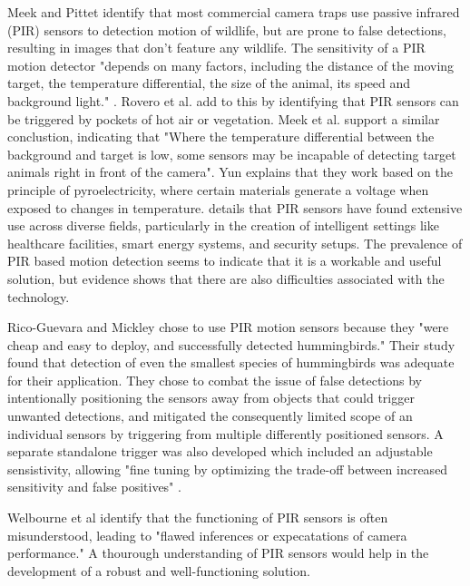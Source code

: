 \documentclass[class=report,11pt,crop=false]{standalone}
\begin{document}
Meek and Pittet \cite{meek2012user} identify that most commercial camera traps use passive infrared (PIR) sensors to detection motion of wildlife, but are prone to false detections, resulting in images that don't feature any wildlife. The sensitivity of a PIR motion detector "depends on many factors, including the distance of the moving target, the temperature differential, the size of the animal, its speed and background light." \cite{meek2012user}. Rovero et al. \cite{rovero2013which} add to this by identifying that PIR sensors can be triggered by pockets of hot air or vegetation. Meek et al. \cite{meek2012introduction} support a similar conclustion, indicating that "Where the temperature differential between the background and target is low, some sensors may be incapable of detecting target animals right in front of the camera". Yun \cite{yun2014detecting} explains that they work based on the principle of pyroelectricity, where certain materials generate a voltage when exposed to changes in temperature. \cite{amusa2015pyro} details that PIR sensors have found extensive use across diverse fields, particularly in the creation of intelligent settings like healthcare facilities, smart energy systems, and security setups.
The prevalence of PIR based motion detection seems to indicate that it is a workable and useful solution, but evidence shows that there are also difficulties associated with the technology.

Rico-Guevara and Mickley \cite{rico-guevara2017bring} chose to use PIR motion sensors because they "were cheap and easy to deploy, and successfully detected hummingbirds." Their study found that detection of even the smallest species of hummingbirds was adequate for their application. They chose to combat the issue of false detections by intentionally positioning the sensors away from objects that could trigger unwanted detections, and mitigated the consequently limited scope of an individual sensors by triggering from multiple differently positioned sensors. A separate standalone trigger was also developed which included an adjustable sensistivity, allowing "fine tuning by optimizing the trade-off between increased sensitivity and false positives" \cite{rico-guevara2017bring}.

Welbourne et al \cite{welbourne2016how} identify that the functioning of PIR sensors is often misunderstood, leading to "flawed inferences or expecatations of camera performance." A thourough understanding of PIR sensors would help in the development of a robust and well-functioning solution.
\end{document}
